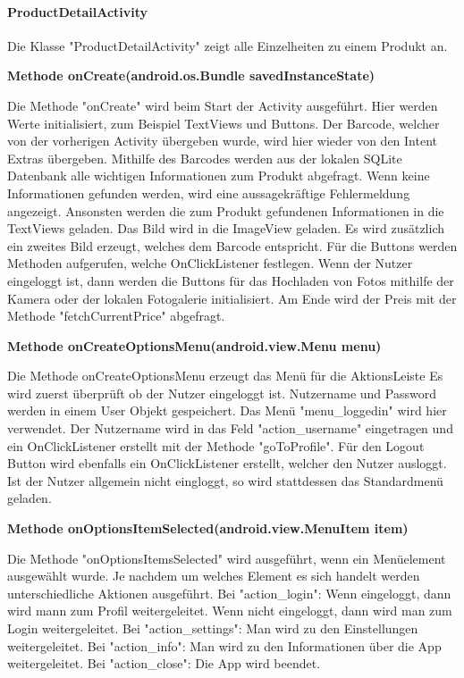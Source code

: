 \documentclass{scrartcl}
\begin{document}
\paragraph{ProductDetailActivity} Die Klasse "ProductDetailActivity" zeigt alle Einzelheiten zu einem Produkt an. \newline

\noindent\textbf{Methode onCreate(android.os.Bundle savedInstanceState)} 

\noindent Die Methode "onCreate" wird beim Start der Activity ausgeführt. Hier werden Werte initialisiert, zum Beispiel TextViews und Buttons. Der Barcode, welcher von der vorherigen Activity übergeben wurde, wird hier wieder von den Intent Extras übergeben. Mithilfe des Barcodes werden aus der lokalen SQLite Datenbank alle wichtigen Informationen zum Produkt abgefragt. Wenn keine Informationen gefunden werden, wird eine aussagekräftige Fehlermeldung angezeigt. Ansonsten werden die zum Produkt gefundenen Informationen in die TextViews geladen. Das Bild wird in die ImageView geladen. Es wird zusätzlich ein zweites Bild erzeugt, welches dem Barcode entspricht. Für die Buttons werden Methoden aufgerufen, welche OnClickListener festlegen. Wenn der Nutzer eingeloggt ist, dann werden die Buttons für das Hochladen von Fotos mithilfe der Kamera oder der lokalen Fotogalerie initialisiert. Am Ende wird der Preis mit der Methode "fetchCurrentPrice" abgefragt. \newline

\noindent\textbf{Methode onCreateOptionsMenu(android.view.Menu menu)} 

\noindent Die Methode onCreateOptionsMenu erzeugt das Menü für die AktionsLeiste Es wird zuerst überprüft ob der Nutzer eingeloggt ist. Nutzername und Password werden in einem User Objekt gespeichert. Das Menü "menu\_loggedin" wird hier verwendet. Der Nutzername wird in das Feld "action\_username" eingetragen und ein OnClickListener erstellt mit der Methode "goToProfile". Für den Logout Button wird ebenfalls ein OnClickListener erstellt, welcher den Nutzer ausloggt. Ist der Nutzer allgemein nicht eingloggt, so wird stattdessen das Standardmenü geladen. \newline

\noindent\textbf{Methode onOptionsItemSelected(android.view.MenuItem item)} 

\noindent Die Methode "onOptionsItemsSelected" wird ausgeführt, wenn ein Menüelement ausgewählt wurde. Je nachdem um welches Element es sich handelt werden unterschiedliche Aktionen ausgeführt. Bei "action\_login": Wenn eingeloggt, dann wird mann zum Profil weitergeleitet. Wenn nicht eingeloggt, dann wird man zum Login weitergeleitet. Bei "action\_settings": Man wird zu den Einstellungen weitergeleitet. Bei "action\_info": Man wird zu den Informationen über die App weitergeleitet. Bei "action\_close": Die App wird beendet. \newline
\end{document}

